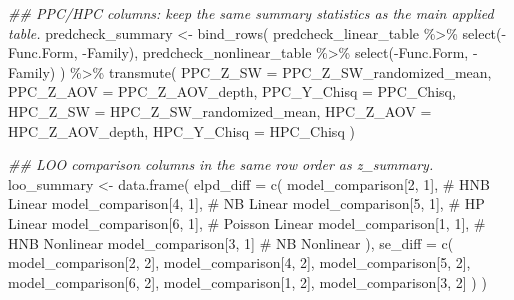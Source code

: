 \documentclass[
  english,
  letterpaper,
  DIV=11,
  numbers=noendperiod]{scrartcl}
\newenvironment{Shaded}{\begin{snugshade}}{\end{snugshade}}
\newcommand{\AttributeTok}[1]{\textcolor[rgb]{0.40,0.45,0.13}{#1}}
\newcommand{\CommentTok}[1]{\textcolor[rgb]{0.37,0.37,0.37}{#1}}
\newcommand{\DecValTok}[1]{\textcolor[rgb]{0.68,0.00,0.00}{#1}}
\newcommand{\DocumentationTok}[1]{\textcolor[rgb]{0.37,0.37,0.37}{\textit{#1}}}
\newcommand{\FunctionTok}[1]{\textcolor[rgb]{0.28,0.35,0.67}{#1}}
\newcommand{\NormalTok}[1]{\textcolor[rgb]{0.00,0.23,0.31}{#1}}
\newcommand{\OtherTok}[1]{\textcolor[rgb]{0.00,0.23,0.31}{#1}}
\newcommand{\SpecialCharTok}[1]{\textcolor[rgb]{0.37,0.37,0.37}{#1}}
\newcommand{\StringTok}[1]{\textcolor[rgb]{0.13,0.47,0.30}{#1}}
\begin{document}
\begin{Shaded}
\begin{Highlighting}[]
\DocumentationTok{\#\# PPC/HPC columns: keep the same summary statistics as the main applied table.}
\NormalTok{predcheck\_summary }\OtherTok{\textless{}{-}} \FunctionTok{bind\_rows}\NormalTok{(}
\NormalTok{  predcheck\_linear\_table }\SpecialCharTok{\%\textgreater{}\%} \FunctionTok{select}\NormalTok{(}\SpecialCharTok{{-}}\StringTok{\textasciigrave{}}\AttributeTok{Func.Form}\StringTok{\textasciigrave{}}\NormalTok{, }\SpecialCharTok{{-}}\NormalTok{Family),}
\NormalTok{  predcheck\_nonlinear\_table }\SpecialCharTok{\%\textgreater{}\%} \FunctionTok{select}\NormalTok{(}\SpecialCharTok{{-}}\StringTok{\textasciigrave{}}\AttributeTok{Func.Form}\StringTok{\textasciigrave{}}\NormalTok{, }\SpecialCharTok{{-}}\NormalTok{Family)}
\NormalTok{) }\SpecialCharTok{\%\textgreater{}\%}
  \FunctionTok{transmute}\NormalTok{(}
    \AttributeTok{PPC\_Z\_SW    =}\NormalTok{ PPC\_Z\_SW\_randomized\_mean,}
    \AttributeTok{PPC\_Z\_AOV   =}\NormalTok{ PPC\_Z\_AOV\_depth,}
    \AttributeTok{PPC\_Y\_Chisq =}\NormalTok{ PPC\_Chisq,}
    \AttributeTok{HPC\_Z\_SW    =}\NormalTok{ HPC\_Z\_SW\_randomized\_mean,}
    \AttributeTok{HPC\_Z\_AOV   =}\NormalTok{ HPC\_Z\_AOV\_depth,}
    \AttributeTok{HPC\_Y\_Chisq =}\NormalTok{ HPC\_Chisq}
\NormalTok{  )}

\DocumentationTok{\#\# LOO comparison columns in the same row order as z\_summary.}
\NormalTok{loo\_summary }\OtherTok{\textless{}{-}} \FunctionTok{data.frame}\NormalTok{(}
  \AttributeTok{elpd\_diff =} \FunctionTok{c}\NormalTok{(}
\NormalTok{    model\_comparison[}\DecValTok{2}\NormalTok{, }\DecValTok{1}\NormalTok{],  }\CommentTok{\# HNB Linear}
\NormalTok{    model\_comparison[}\DecValTok{4}\NormalTok{, }\DecValTok{1}\NormalTok{],  }\CommentTok{\# NB Linear}
\NormalTok{    model\_comparison[}\DecValTok{5}\NormalTok{, }\DecValTok{1}\NormalTok{],  }\CommentTok{\# HP Linear}
\NormalTok{    model\_comparison[}\DecValTok{6}\NormalTok{, }\DecValTok{1}\NormalTok{],  }\CommentTok{\# Poisson Linear}
\NormalTok{    model\_comparison[}\DecValTok{1}\NormalTok{, }\DecValTok{1}\NormalTok{],  }\CommentTok{\# HNB Nonlinear}
\NormalTok{    model\_comparison[}\DecValTok{3}\NormalTok{, }\DecValTok{1}\NormalTok{]   }\CommentTok{\# NB Nonlinear}
\NormalTok{  ),}
  \AttributeTok{se\_diff =} \FunctionTok{c}\NormalTok{(}
\NormalTok{    model\_comparison[}\DecValTok{2}\NormalTok{, }\DecValTok{2}\NormalTok{],}
\NormalTok{    model\_comparison[}\DecValTok{4}\NormalTok{, }\DecValTok{2}\NormalTok{],}
\NormalTok{    model\_comparison[}\DecValTok{5}\NormalTok{, }\DecValTok{2}\NormalTok{],}
\NormalTok{    model\_comparison[}\DecValTok{6}\NormalTok{, }\DecValTok{2}\NormalTok{],}
\NormalTok{    model\_comparison[}\DecValTok{1}\NormalTok{, }\DecValTok{2}\NormalTok{],}
\NormalTok{    model\_comparison[}\DecValTok{3}\NormalTok{, }\DecValTok{2}\NormalTok{]}
\NormalTok{  )}
\NormalTok{)}


\end{Highlighting}
\end{Shaded}
\end{document}
